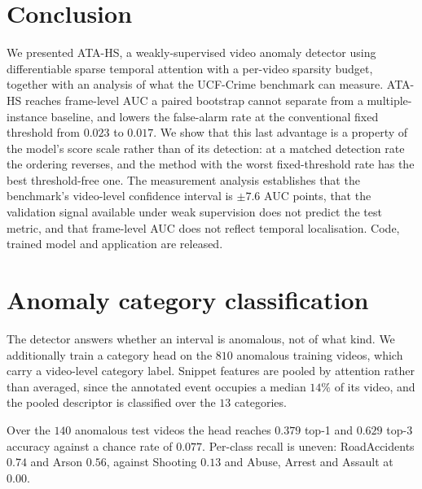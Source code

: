 \documentclass[11pt]{article}
\begin{document}
\section{Conclusion}

We presented ATA-HS, a weakly-supervised video anomaly detector using
differentiable sparse temporal attention with a per-video sparsity budget,
together with an analysis of what the UCF-Crime benchmark can measure. ATA-HS
reaches frame-level AUC a paired bootstrap cannot separate from a
multiple-instance baseline, and lowers the false-alarm rate at the conventional
fixed threshold from $0.023$ to $0.017$. We show that this last advantage is a
property of the model's score scale rather than of its detection: at a matched
detection rate the ordering reverses, and the method with the worst
fixed-threshold rate has the best threshold-free one. The measurement analysis establishes that the benchmark's
video-level confidence interval is $\pm7.6$ AUC points, that the validation signal
available under weak supervision does not predict the test metric, and that
frame-level AUC does not reflect temporal localisation. Code, trained model and application are
released.


\appendix
\section{Anomaly category classification}
\label{app:category}

The detector answers whether an interval is anomalous, not of what kind. We
additionally train a category head on the $810$ anomalous training videos, which
carry a video-level category label. Snippet features are pooled by attention
rather than averaged, since the annotated event occupies a median $14\%$ of its
video, and the pooled descriptor is classified over the $13$ categories.

Over the $140$ anomalous test videos the head reaches $0.379$ top-1 and $0.629$
top-3 accuracy against a chance rate of $0.077$. Per-class recall is uneven:
RoadAccidents $0.74$ and Arson $0.56$, against Shooting $0.13$ and Abuse, Arrest
and Assault at $0.00$. 


\end{document}
